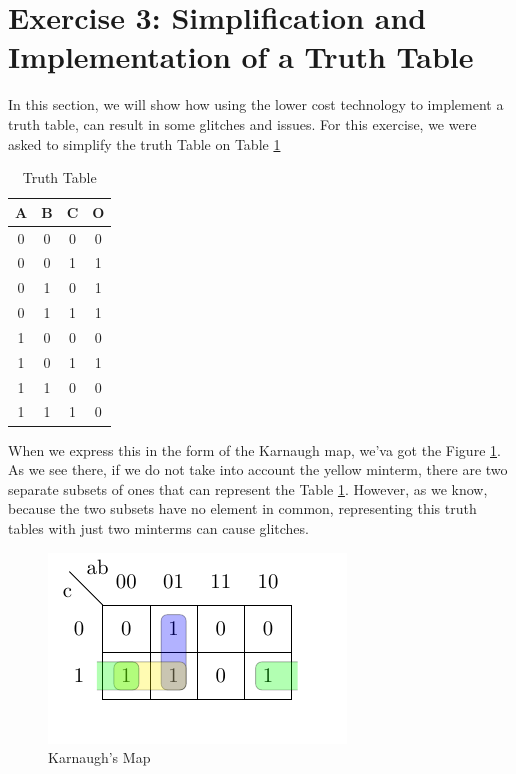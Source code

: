 \section{\color{olive}Exercise 3: Simplification and Implementation of a Truth Table }

In this section, we will show how using the lower cost technology
to implement a truth table, can result in some glitches and issues.
For this exercise, we were asked to simplify the truth Table on Table
\ref{3_1}

\begin{table}[h!]
\begin{centering}
\begin{tabular}{|c|c|c|c|}
\hline 
A & B & C & O\tabularnewline
\hline 
\hline 
0 & 0 & 0 & 0\tabularnewline
\hline 
0 & 0 & 1 & 1\tabularnewline
\hline 
0 & 1 & 0 & 1\tabularnewline
\hline 
0 & 1 & 1 & 1\tabularnewline
\hline 
1 & 0 & 0 & 0\tabularnewline
\hline 
1 & 0 & 1 & 1\tabularnewline
\hline 
1 & 1 & 0 & 0\tabularnewline
\hline 
1 & 1 & 1 & 0\tabularnewline
\hline 
\end{tabular}
\par\end{centering}
\caption{Truth Table}
\label{3_1}

\end{table}

When we express this in the form of the Karnaugh map, we'va got the
Figure \ref{3_2}. As we see there, if we do not take into account
the yellow minterm, there are two separate subsets of ones that can
represent the Table \ref{3_1}. However, as we know, because the two
subsets have no element in common, representing this truth tables
with just two minterms can cause glitches.

\begin{figure}[h!]
\begin{centering}
\includegraphics{../Exercise3/images/Karnaugh}
\par\end{centering}
\caption{Karnaugh's Map}
\label{3_2}

\end{figure}


